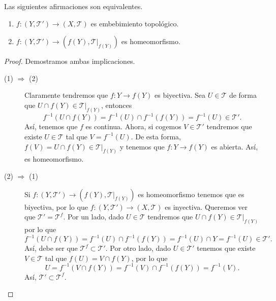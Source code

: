 \begin{prop}
Las siguientes afirmaciones son equivalentes. 
\begin{enumerate}
\item $\displaystyle f : \left(Y, \mathcal{T}'\right)\to \left(X, \mathcal{T}\right) $ es embebimiento topológico. 
\item $\displaystyle f : \left(Y, \mathcal{T}'\right)\to \left(f\left(Y\right), \mathcal{T}|_{f\left(Y\right)}\right) $ es homeomorfismo. 
\end{enumerate}
\end{prop}
\begin{proof}
Demostramos ambas implicaciones.
\begin{description}
\item[(1) $\displaystyle \Rightarrow $ (2)] Claramente tendremos que $\displaystyle f : Y \to f\left(Y\right) $ es biyectiva. Sea $\displaystyle U \in \mathcal{T} $ de forma que $\displaystyle U \cap f\left(Y\right)\in \mathcal{T}|_{f\left(Y\right)} $, entonces
	\[f^{-1}\left(U \cap f\left(Y\right)\right)= f^{-1}\left(U\right) \cap f^{-1}\left(f\left(Y\right)\right)=f^{-1}\left(U\right)\in \mathcal{T}' .\]
	Así, tenemos que $\displaystyle f $ es continua. Ahora, si cogemos $\displaystyle V \in \mathcal{T}' $ tendremos que existe $\displaystyle U \in \mathcal{T} $ tal que $\displaystyle V = f^{-1}\left(U\right) $. De esta forma, $\displaystyle f\left(V\right)=U \cap f\left(Y\right)\in \mathcal{T}|_{f\left(Y\right)} $ y tenemos que $\displaystyle f : Y \to f\left(Y\right) $ es abierta. Así, es homeomorfismo.
\item[(2) $\displaystyle \Rightarrow $ (1)] Si $\displaystyle f : \left(Y, \mathcal{T}'\right)\to \left(f\left(Y\right), \mathcal{T}|_{f\left(Y\right)}\right) $ es homeomorfismo tenemos que es biyectiva, por lo que $\displaystyle f:\left(Y, \mathcal{T}'\right)\to \left(X, \mathcal{T}\right) $ es inyectiva. Queremos ver que $\displaystyle \mathcal{T}' = \mathcal{T}^{f} $. Por un lado, dado $\displaystyle U \in \mathcal{T} $ tendremos que $\displaystyle U \cap f\left(Y\right)\in \mathcal{T}|_{f\left(Y\right)} $ por lo que 
	\[f^{-1}\left(U\cap f\left(Y\right)\right) = f^{-1}\left(U\right) \cap f^{-1}\left(f\left(Y\right)\right)=f^{-1}\left(U\right) \cap Y=f^{-1}\left(U\right) \in \mathcal{T}' .\]
	Así, debe ser que $\displaystyle \mathcal{T}^{f}\subset \mathcal{T}' $. Por otro lado, dado $\displaystyle U \in \mathcal{T}' $ tenemos que existe $\displaystyle V \in \mathcal{T} $ tal que $\displaystyle f\left(U\right)=V \cap f\left(Y\right) $, por lo que 
	\[U = f^{-1}\left(V \cap f\left(Y\right)\right)=f^{-1}\left(V\right)\cap f^{-1}\left(f\left(Y\right)\right)=f^{-1}\left(V\right) .\]
	Así, $\displaystyle \mathcal{T}' \subset \mathcal{T}^{f} $. 
\end{description}
\end{proof}

